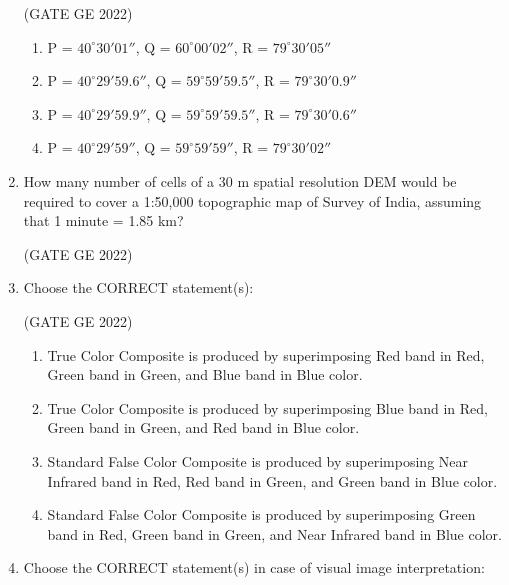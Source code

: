 \documentclass[journal,12pt,onecolumn]{IEEEtran}
\theoremstyle{remark}
\begin{document}
\begin{enumerate}
\hfill (GATE GE 2022)

\begin{enumerate}
    \item P = $40^\circ 30' 01''$, Q = $60^\circ 00' 02''$, R = $79^\circ 30' 05''$
    \item P = $40^\circ 29' 59.6''$, Q = $59^\circ 59' 59.5''$, R = $79^\circ 30' 0.9''$
    \item P = $40^\circ 29' 59.9''$, Q = $59^\circ 59' 59.5''$, R = $79^\circ 30' 0.6''$
    \item P = $40^\circ 29' 59''$, Q = $59^\circ 59' 59''$, R = $79^\circ 30' 02''$
\end{enumerate}

\item How many number of cells of a 30 m spatial resolution DEM would be required to cover a 1:50,000 topographic map of Survey of India, assuming that 1 minute = 1.85 km?

\hfill (GATE GE 2022)

\begin{enumerate}
\end{enumerate}

\item Choose the CORRECT statement(s):

\hfill (GATE GE 2022)

\begin{enumerate}
    \item True Color Composite is produced by superimposing Red band in Red, Green band in Green, and Blue band in Blue color.
    \item True Color Composite is produced by superimposing Blue band in Red, Green band in Green, and Red band in Blue color.
    \item Standard False Color Composite is produced by superimposing Near Infrared band in Red, Red band in Green, and Green band in Blue color.
    \item Standard False Color Composite is produced by superimposing Green band in Red, Green band in Green, and Near Infrared band in Blue color.
\end{enumerate}

\item Choose the CORRECT statement(s) in case of visual image interpretation:


\end{enumerate}
\end{document}
